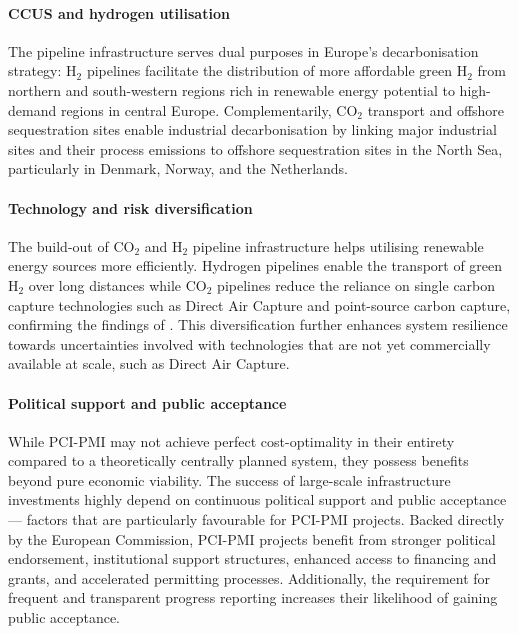\documentclass[pdflatex,sn-nature]{sn-jnl}%
\theoremstyle{thmstyleone}%
\theoremstyle{thmstyletwo}%
\theoremstyle{thmstylethree}%
\begin{document}
\paragraph{CCUS and hydrogen utilisation}
The pipeline infrastructure serves dual purposes in Europe's decarbonisation strategy: H$_2$ pipelines facilitate the distribution of more affordable green H$_2$ from northern and south-western regions rich in renewable energy potential to high-demand regions in central Europe. Complementarily, CO$_2$ transport and offshore sequestration sites enable industrial decarbonisation by linking major industrial sites and their process emissions to offshore sequestration sites in the North Sea, particularly in Denmark, Norway, and the Netherlands.

\paragraph{Technology and risk diversification}
The build-out of CO$_2$ and H$_2$ pipeline infrastructure helps utilising renewable energy sources more efficiently. Hydrogen pipelines enable the transport of green H$_2$ over long distances while CO$_2$ pipelines reduce the reliance on single carbon capture technologies such as Direct Air Capture and point-source carbon capture, confirming the findings of \cite{hofmannH2CO2Network2025}. This diversification further enhances system resilience towards uncertainties involved with technologies that are not yet commercially available at scale, such as Direct Air Capture.

\paragraph{Political support and public acceptance} 
While PCI-PMI may not achieve perfect cost-optimality in their entirety compared to a theoretically centrally planned system, they possess benefits beyond pure economic viability. The success of large-scale infrastructure investments highly depend on continuous political support and public acceptance --- factors that are particularly favourable for PCI-PMI projects.
Backed directly by the European Commission, PCI-PMI projects benefit from stronger political endorsement, institutional support structures, enhanced access to financing and grants, and accelerated permitting processes. Additionally, the requirement for frequent and transparent progress reporting increases their likelihood of gaining public acceptance.

\clearpage
\end{document}
